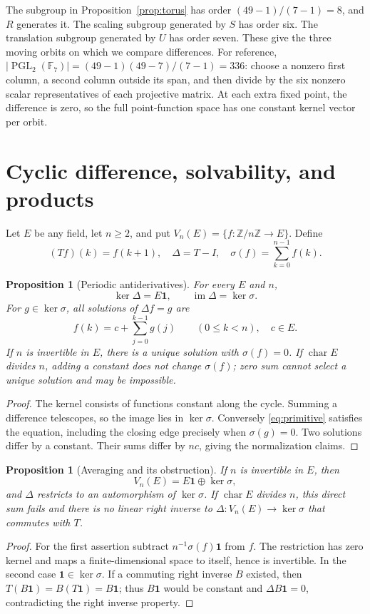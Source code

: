\documentclass[11pt]{article}
\newtheorem{proposition}[theorem]{Proposition}
\theoremstyle{definition}
\theoremstyle{remark}
\newcommand{\F}{\mathbb F}
\newcommand{\PGL}{\operatorname{PGL}}
\newcommand{\im}{\operatorname{im}}
\begin{document}
The subgroup in Proposition~\ref{prop:torus} has order
$(49-1)/(7-1)=8$, and $R$ generates it. The scaling subgroup generated by
$S$ has order six. The translation subgroup generated by $U$ has order
seven. These give the three moving orbits on which we compare differences.
For reference, $|\PGL_2(\F_7)|=(49-1)(49-7)/(7-1)=336$:
choose a nonzero first column, a second column outside its span, and then
divide by the six nonzero scalar representatives of each projective matrix.
At each extra fixed point, the difference is zero, so the full point-function
space has one constant kernel vector per orbit.

\section{Cyclic difference, solvability, and products}
Let $E$ be any field, let $n\ge2$, and put
$V_n(E)=\{f:\mathbb Z/n\mathbb Z\to E\}$.
Define
\[
 (Tf)(k)=f(k+1),\quad \Delta=T-I,\quad
 \sigma(f)=\sum_{k=0}^{n-1}f(k).
\]
\begin{proposition}[Periodic antiderivatives]\label{prop:antiderivative}
For every $E$ and $n$,
\[
 \ker\Delta=E\mathbf1,\qquad
 \im\Delta=\ker\sigma.
\]
For $g\in\ker\sigma$, all solutions of $\Delta f=g$ are
\begin{equation}\label{eq:primitive}
 f(k)=c+\sum_{j=0}^{k-1}g(j)\qquad(0\le k<n),\quad c\in E.
\end{equation}
If $n$ is invertible in $E$, there is a unique solution with $\sigma(f)=0$.
If $\operatorname{char}E$ divides $n$, adding a constant does not change
$\sigma(f)$; zero sum cannot select a unique solution and may be impossible.
\end{proposition}
\begin{proof}
The kernel consists of functions constant along the cycle. Summing a
difference telescopes, so the image lies in $\ker\sigma$. Conversely
\eqref{eq:primitive} satisfies the equation, including the closing edge
precisely when $\sigma(g)=0$. Two solutions differ by a constant. Their sums
differ by $nc$, giving the normalization claims.
\end{proof}

\begin{proposition}[Averaging and its obstruction]\label{prop:average}
If $n$ is invertible in $E$, then
\[
 V_n(E)=E\mathbf1\oplus\ker\sigma,
\]
and $\Delta$ restricts to an automorphism of $\ker\sigma$.
If $\operatorname{char}E$ divides $n$, this direct sum fails and there is
no linear right inverse to $\Delta:V_n(E)\to\ker\sigma$ that
commutes with $T$.
\end{proposition}
\begin{proof}
For the first assertion subtract $n^{-1}\sigma(f)\mathbf1$ from $f$.
The restriction has zero kernel and maps a finite-dimensional space to
itself, hence is invertible. In the second case $\mathbf1\in\ker\sigma$.
If a commuting right inverse $B$ existed, then
$T(B\mathbf1)=B(T\mathbf1)=B\mathbf1$; thus $B\mathbf1$ would be constant
and $\Delta B\mathbf1=0$, contradicting the right inverse property.
\end{proof}
\end{document}
